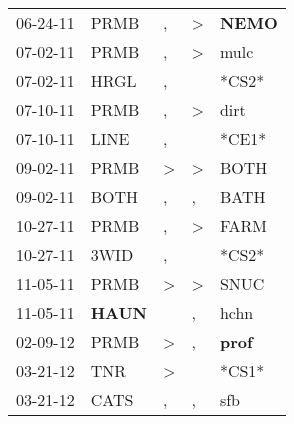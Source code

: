\begin{supertabular}{p{0.07\textwidth}p{0.06\textwidth}p{0.02\textwidth}p{0.02\textwidth}p{0.06\textwidth}}
          06-24-11\textsuperscript{} &           PRMB\textsuperscript{} &                , &     \textgreater &  \textbf{NEMO\textsuperscript{}} \\
          07-02-11\textsuperscript{} &           PRMB\textsuperscript{} &                , &     \textgreater &           mulc\textsuperscript{} \\
          07-02-11\textsuperscript{} &           HRGL\textsuperscript{} &                , &                  &                            *CS2* \\
          07-10-11\textsuperscript{} &           PRMB\textsuperscript{} &                , &     \textgreater &           dirt\textsuperscript{} \\
          07-10-11\textsuperscript{} &           LINE\textsuperscript{} &                , &                  &                            *CE1* \\
          09-02-11\textsuperscript{} &           PRMB\textsuperscript{} &     \textgreater &     \textgreater &           BOTH\textsuperscript{} \\
          09-02-11\textsuperscript{} &           BOTH\textsuperscript{} &                , &                , &           BATH\textsuperscript{} \\
          10-27-11\textsuperscript{} &           PRMB\textsuperscript{} &                , &     \textgreater &           FARM\textsuperscript{} \\
          10-27-11\textsuperscript{} &           3WID\textsuperscript{} &                , &                  &                            *CS2* \\
          11-05-11\textsuperscript{} &           PRMB\textsuperscript{} &     \textgreater &     \textgreater &           SNUC\textsuperscript{} \\
          11-05-11\textsuperscript{} &  \textbf{HAUN\textsuperscript{}} &                  &                , &           hchn\textsuperscript{} \\
          02-09-12\textsuperscript{} &           PRMB\textsuperscript{} &     \textgreater &                , &  \textbf{prof\textsuperscript{}} \\
          03-21-12\textsuperscript{} &            TNR\textsuperscript{} &     \textgreater &                  &                            *CS1* \\
          03-21-12\textsuperscript{} &           CATS\textsuperscript{} &                , &                , &            sfb\textsuperscript{} \\

\end{supertabular}
